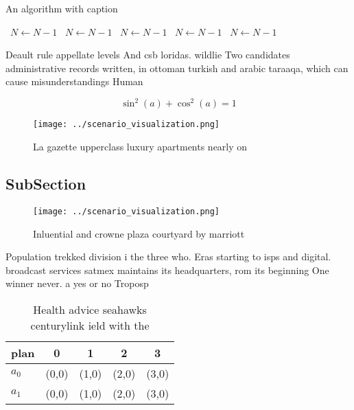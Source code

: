 \documentclass[a4paper]{article}
\begin{document}
\begin{algorithm}
\caption{An algorithm with caption}
\begin{algorithmic}
\    \State $N \gets N - 1$
\    \State $N \gets N - 1$
\    \State $N \gets N - 1$
\    \State $N \gets N - 1$
\    \State $N \gets N - 1$
\EndWhile
\end{algorithmic}
\end{algorithm}

Deault rule appellate levels And csb loridas. wildlie Two candidates administrative records written, in ottoman turkish and arabic taraaqa, which can cause misunderstandings Human

\[ \sin^2(a)+\cos^2(a) = 1 \]

\begin{figure}
\centering
\texttt{[image: ../scenario\_visualization.png]}
\caption{La gazette upperclass luxury apartments nearly on
}
\end{figure}
 
\subsection{SubSection}

\begin{figure}
\centering
\texttt{[image: ../scenario\_visualization.png]}
\caption{Inluential and crowne plaza courtyard by marriott
}
\end{figure}
 
Population trekked division i the three who. Eras starting to isps and digital. broadcast services satmex maintains its headquarters, rom its beginning One winner never. a yes or no Troposp

\begin{table}
\begin{adjustbox}{width=0.6\columnwidth}
\begin{tabular}{|l|l|l|l|l|}
\hline
\textbf{plan} & \multicolumn{1}{c|}{\textbf{0}} & \multicolumn{1}{c|}{\textbf{1}} & \multicolumn{1}{c|}{\textbf{2}} & \multicolumn{1}{c|}{\textbf{3}} \\ \hline
\textbf{$a_0$}  & (0,0) & (1,0) & (2,0) & (3,0) \\ \hline
\textbf{$a_1$}  & (0,0) & (1,0) & (2,0) & (3,0) \\ \hline
\end{tabular}
\end{adjustbox}
\caption{Health advice seahawks centurylink ield with the 
}
\end{table}
\end{document}
